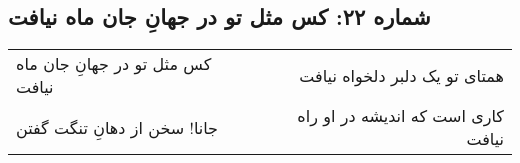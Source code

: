 \begin{center}
\section*{شماره ۲۲: کس مثل تو در جهانِ جان ماه نیافت}
\label{sec:022}
\begin{longtable}{l p{0.5cm} r}
کس مثل تو در جهانِ جان ماه نیافت
&&
همتای تو یک دلبر دلخواه نیافت
\\
جانا! سخن از دهانِ تنگت گفتن
&&
کاری است که اندیشه در او راه نیافت
\\
\end{longtable}
\end{center}
